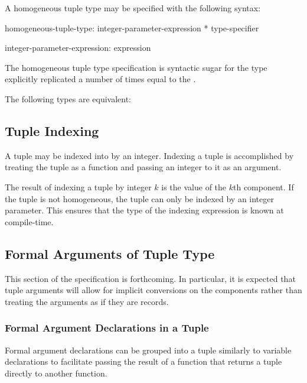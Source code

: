 
A homogeneous tuple type may be specified with the following syntax:
\begin{syntax}
homogeneous-tuple-type:
  integer-parameter-expression * type-specifier

integer-parameter-expression:
  expression
\end{syntax}
The homogeneous tuple type specification is syntactic sugar for the
type explicitly replicated a number of times equal to the
.
\begin{example}
The following types are equivalent:
\begin{center}
 \hspace{2pc} 
\end{center}
\end{example}

\subsection{Tuple Indexing}
\label{Tuple_Indexing}

A tuple may be indexed into by an integer.  Indexing a tuple is
accomplished by treating the tuple as a function and passing an
integer to it as an argument.

The result of indexing a tuple by integer $k$ is the value of the
$k$th component.  If the tuple is not homogeneous, the tuple can only
be indexed by an integer parameter.  This ensures that the type of the
indexing expression is known at compile-time.

\subsection{Formal Arguments of Tuple Type}
\label{Formal_Arguments_of_Tuple_Type}


This section of the specification is forthcoming.  In particular, it
is expected that tuple arguments will allow for implicit conversions
on the components rather than treating the arguments as if they are
records.

\subsubsection{Formal Argument Declarations in a Tuple}
\label{Formal_Argument_Declarations_in_a_Tuple}

Formal argument declarations can be grouped into a tuple similarly to
variable declarations to facilitate passing the result of a function that
returns a tuple directly to another function.
